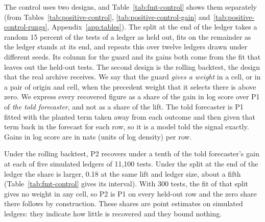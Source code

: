 The control uses two designs, and Table~\ref{tab:fmt-control} shows them separately (from Tables~\ref{tab:positive-control}, \ref{tab:positive-control-gain} and~\ref{tab:positive-control-rungs}, Appendix~\ref{app:tables}). The split at the end of the ledger takes a random 15 percent of the tests of a ledger as held out, fits on the remainder as the ledger stands at its end, and repeats this over twelve ledgers drawn under different seeds. Its column for the guard and its gains both come from the fit that leaves out the held-out tests. The second design is the rolling backtest, the design that the real archive receives. We say that the guard \emph{gives a weight} in a cell, or in a pair of origin and cell, when the precedent weight that it selects there is above zero. We express every recovered figure as a share of the gain in log score over P1 of \emph{the told forecaster}, and not as a share of the lift. The told forecaster is P1 fitted with the planted term taken away from each outcome and then given that term back in the forecast for each row, so it is a model told the signal exactly. Gains in log score are in nats (units of log density) per row.

Under the rolling backtest, P2 recovers under a tenth of the told forecaster's gain at each of five simulated ledgers of 11,100 tests. Under the split at the end of the ledger the share is larger, 0.18 at the same lift and ledger size, about a fifth (Table~\ref{tab:fmt-control} gives its interval). With 300 tests, the fit of that split gives no weight in any cell, so P2 is P1 on every held-out row and the zero share there follows by construction. These shares are point estimates on simulated ledgers: they indicate how little is recovered and they bound nothing.

